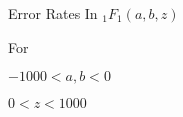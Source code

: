 \begin{center}\large
Error Rates In $_1F_1(a,b,z)$

For

$-1000 < a,b < 0$

$0 < z < 1000$
\end{center}
